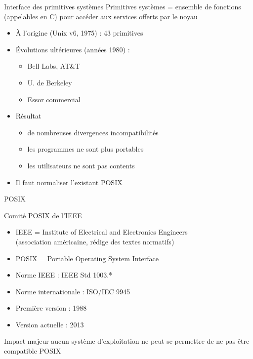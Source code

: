 
\begin {frame} {Interface des primitives systèmes}
    Primitives systèmes = ensemble de fonctions (appelables en C)
    pour accéder aux services offerts par le noyau

    \begin {itemize}
	\item À l'origine (Unix v6, 1975) : 43 primitives
	\item Évolutions ultérieures (années 1980) :
	    \begin {itemize}
		\item Bell Labs, AT\&T
		\item U. de Berkeley
		\item Essor commercial
	    \end {itemize}
	\item Résultat
	    \begin {itemize}
		\item de nombreuses divergences \implique incompatibilités
		\item les programmes ne sont plus portables
		\item les utilisateurs ne sont pas contents
	    \end {itemize}
	\item Il faut normaliser l'existant \implique POSIX
    \end {itemize}

\end {frame}

\begin {frame} {POSIX}

    Comité POSIX de l’IEEE
    \begin {itemize}
	\item IEEE = Institute of Electrical and Electronics Engineers
	    \\
	    (association américaine, rédige des textes normatifs)
	\item POSIX = Portable Operating System Interface
	\item Norme IEEE : IEEE Std 1003.*
	\item Norme internationale : ISO/IEC 9945
	\item Première version : 1988
	\item Version actuelle : 2013
    \end {itemize}

    \vspace* {3mm}

    Impact majeur \implique aucun système d'exploitation ne peut
    se permettre de ne pas être compatible POSIX
\end {frame}

